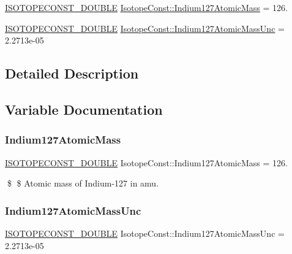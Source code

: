 \begin{DoxyCompactItemize}
\item 
\mbox{\hyperlink{group___isotope_const-_macros_ga8f45a7272ce02c0b4c65c44636ed719a}{I\+S\+O\+T\+O\+P\+E\+C\+O\+N\+S\+T\+\_\+\+D\+O\+U\+B\+LE}} \mbox{\hyperlink{group___isotope_const-_indium-_in127_ga9b807dbbd94965fcbc953bf5363f4fb2}{Isotope\+Const\+::\+Indium127\+Atomic\+Mass}} = 126.
\item 
\mbox{\hyperlink{group___isotope_const-_macros_ga8f45a7272ce02c0b4c65c44636ed719a}{I\+S\+O\+T\+O\+P\+E\+C\+O\+N\+S\+T\+\_\+\+D\+O\+U\+B\+LE}} \mbox{\hyperlink{group___isotope_const-_indium-_in127_ga92a98817b701aadf4ee8ece89400a946}{Isotope\+Const\+::\+Indium127\+Atomic\+Mass\+Unc}} = 2.\+2713e-\/05
\end{DoxyCompactItemize}


\subsection{Detailed Description}


\subsection{Variable Documentation}
\mbox{\label{group___isotope_const-_indium-_in127_ga9b807dbbd94965fcbc953bf5363f4fb2}} 
\subsubsection{\texorpdfstring{Indium127\+Atomic\+Mass}{Indium127AtomicMass}}
{\footnotesize\ttfamily \mbox{\hyperlink{group___isotope_const-_macros_ga8f45a7272ce02c0b4c65c44636ed719a}{I\+S\+O\+T\+O\+P\+E\+C\+O\+N\+S\+T\+\_\+\+D\+O\+U\+B\+LE}} Isotope\+Const\+::\+Indium127\+Atomic\+Mass = 126.}

\$ \$ Atomic mass of Indium-\/127 in amu. \mbox{\label{group___isotope_const-_indium-_in127_ga92a98817b701aadf4ee8ece89400a946}} 
\subsubsection{\texorpdfstring{Indium127\+Atomic\+Mass\+Unc}{Indium127AtomicMassUnc}}
{\footnotesize\ttfamily \mbox{\hyperlink{group___isotope_const-_macros_ga8f45a7272ce02c0b4c65c44636ed719a}{I\+S\+O\+T\+O\+P\+E\+C\+O\+N\+S\+T\+\_\+\+D\+O\+U\+B\+LE}} Isotope\+Const\+::\+Indium127\+Atomic\+Mass\+Unc = 2.\+2713e-\/05}

